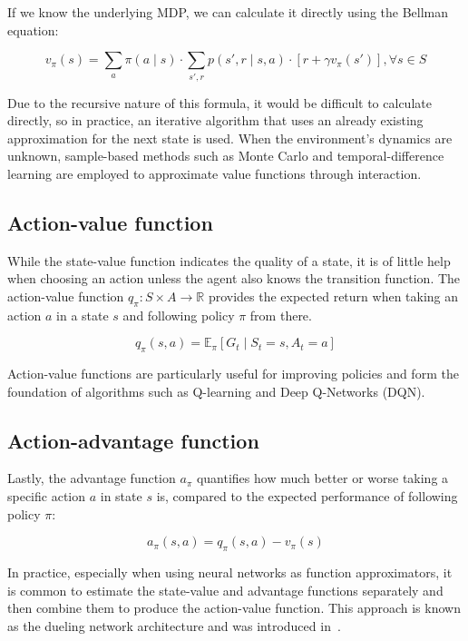 \documentclass[
  digital,     %
  oneside,     %
  nosansbold,  %
  nocolorbold, %
  lof,         %
  lot,         %
]{fithesis4}
\begin{document}
If we know the underlying MDP, we can calculate it directly using the Bellman equation:

\begin{equation}
v_\pi(s) = \sum_a \pi(a\mid s) \cdot \sum_{s',r} p(s',r\mid s,a)\cdot[r+\gamma v_\pi(s')], \forall s \in S
\end{equation}

Due to the recursive nature of this formula, it would be difficult to calculate directly, so in practice, an iterative algorithm that uses an already existing approximation for the next state is used. When the environment's dynamics are unknown, sample-based methods such as Monte Carlo and temporal-difference learning are employed to approximate value functions through interaction.

\subsection{Action-value function}

While the state-value function indicates the quality of a state, it is of little help when choosing an action unless the agent also knows the transition function. The action-value function $q_\pi\colon S \times A \to \mathbb{R}$ provides the expected return when taking an action $a$ in a state $s$ and following policy $\pi$ from there.

\begin{equation}
q_\pi(s,a) = \mathbb{E}_\pi [G_t\mid S_t=s,A_t=a]
\end{equation}

Action-value functions are particularly useful for improving policies and form the foundation of algorithms such as Q-learning and Deep Q-Networks (DQN).

\subsection{Action-advantage function}

Lastly, the advantage function $a_\pi$ quantifies how much better or worse taking a specific action $a$ in state $s$ is, compared to the expected performance of following policy $\pi$:

\begin{equation}
a_\pi(s,a) = q_\pi(s,a)-v_\pi(s)
\end{equation}

In practice, especially when using neural networks as function approximators, it is common to estimate the state-value and advantage functions separately and then combine them to produce the action-value function. This approach is known as the dueling network architecture and was introduced in~\cite{dueling_arch}.
\end{document}
